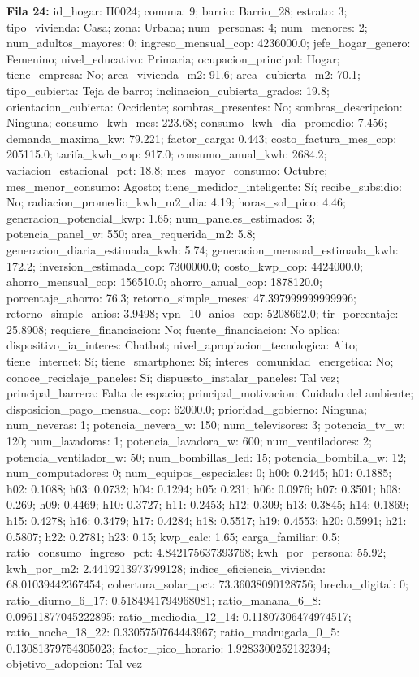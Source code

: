 {\footnotesize\textbf{Fila 24:} id\_hogar: H0024; comuna: 9; barrio: Barrio\_28; estrato: 3; tipo\_vivienda: Casa; zona: Urbana; num\_personas: 4; num\_menores: 2; num\_adultos\_mayores: 0; ingreso\_mensual\_cop: 4236000.0; jefe\_hogar\_genero: Femenino; nivel\_educativo: Primaria; ocupacion\_principal: Hogar; tiene\_empresa: No; area\_vivienda\_m2: 91.6; area\_cubierta\_m2: 70.1; tipo\_cubierta: Teja de barro; inclinacion\_cubierta\_grados: 19.8; orientacion\_cubierta: Occidente; sombras\_presentes: No; sombras\_descripcion: Ninguna; consumo\_kwh\_mes: 223.68; consumo\_kwh\_dia\_promedio: 7.456; demanda\_maxima\_kw: 79.221; factor\_carga: 0.443; costo\_factura\_mes\_cop: 205115.0; tarifa\_kwh\_cop: 917.0; consumo\_anual\_kwh: 2684.2; variacion\_estacional\_pct: 18.8; mes\_mayor\_consumo: Octubre; mes\_menor\_consumo: Agosto; tiene\_medidor\_inteligente: Sí; recibe\_subsidio: No; radiacion\_promedio\_kwh\_m2\_dia: 4.19; horas\_sol\_pico: 4.46; generacion\_potencial\_kwp: 1.65; num\_paneles\_estimados: 3; potencia\_panel\_w: 550; area\_requerida\_m2: 5.8; generacion\_diaria\_estimada\_kwh: 5.74; generacion\_mensual\_estimada\_kwh: 172.2; inversion\_estimada\_cop: 7300000.0; costo\_kwp\_cop: 4424000.0; ahorro\_mensual\_cop: 156510.0; ahorro\_anual\_cop: 1878120.0; porcentaje\_ahorro: 76.3; retorno\_simple\_meses: 47.397999999999996; retorno\_simple\_anios: 3.9498; vpn\_10\_anios\_cop: 5208662.0; tir\_porcentaje: 25.8908; requiere\_financiacion: No; fuente\_financiacion: No aplica; dispositivo\_ia\_interes: Chatbot; nivel\_apropiacion\_tecnologica: Alto; tiene\_internet: Sí; tiene\_smartphone: Sí; interes\_comunidad\_energetica: No; conoce\_reciclaje\_paneles: Sí; dispuesto\_instalar\_paneles: Tal vez; principal\_barrera: Falta de espacio; principal\_motivacion: Cuidado del ambiente; disposicion\_pago\_mensual\_cop: 62000.0; prioridad\_gobierno: Ninguna; num\_neveras: 1; potencia\_nevera\_w: 150; num\_televisores: 3; potencia\_tv\_w: 120; num\_lavadoras: 1; potencia\_lavadora\_w: 600; num\_ventiladores: 2; potencia\_ventilador\_w: 50; num\_bombillas\_led: 15; potencia\_bombilla\_w: 12; num\_computadores: 0; num\_equipos\_especiales: 0; h00: 0.2445; h01: 0.1885; h02: 0.1088; h03: 0.0732; h04: 0.1294; h05: 0.231; h06: 0.0976; h07: 0.3501; h08: 0.269; h09: 0.4469; h10: 0.3727; h11: 0.2453; h12: 0.309; h13: 0.3845; h14: 0.1869; h15: 0.4278; h16: 0.3479; h17: 0.4284; h18: 0.5517; h19: 0.4553; h20: 0.5991; h21: 0.5807; h22: 0.2781; h23: 0.15; kwp\_calc: 1.65; carga\_familiar: 0.5; ratio\_consumo\_ingreso\_pct: 4.842175637393768; kwh\_por\_persona: 55.92; kwh\_por\_m2: 2.4419213973799128; indice\_eficiencia\_vivienda: 68.01039442367454; cobertura\_solar\_pct: 73.36038090128756; brecha\_digital: 0; ratio\_diurno\_6\_17: 0.5184941794968081; ratio\_manana\_6\_8: 0.09611877045222895; ratio\_mediodia\_12\_14: 0.11807306474974517; ratio\_noche\_18\_22: 0.3305750764443967; ratio\_madrugada\_0\_5: 0.13081379754305023; factor\_pico\_horario: 1.9283300252132394; objetivo\_adopcion: Tal vez\par}
